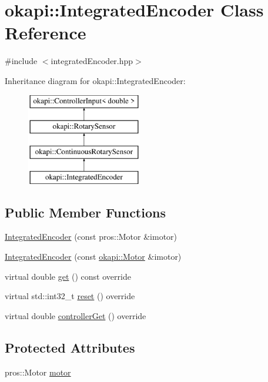 \hypertarget{classokapi_1_1IntegratedEncoder}{}\section{okapi\+::Integrated\+Encoder Class Reference}
\label{classokapi_1_1IntegratedEncoder}


{\ttfamily \#include $<$integrated\+Encoder.\+hpp$>$}

Inheritance diagram for okapi\+::Integrated\+Encoder\+:\begin{figure}[H]
\begin{center}
\leavevmode
\includegraphics[height=4.000000cm]{classokapi_1_1IntegratedEncoder}
\end{center}
\end{figure}
\subsection*{Public Member Functions}
\begin{DoxyCompactItemize}
\item 
\mbox{\hyperlink{classokapi_1_1IntegratedEncoder_a286d2b7796770ea5a91f498687cbe858}{Integrated\+Encoder}} (const pros\+::\+Motor \&imotor)
\item 
\mbox{\hyperlink{classokapi_1_1IntegratedEncoder_a05d0256b51e3631d9ee9177c4eafcb99}{Integrated\+Encoder}} (const \mbox{\hyperlink{classokapi_1_1Motor}{okapi\+::\+Motor}} \&imotor)
\item 
virtual double \mbox{\hyperlink{classokapi_1_1IntegratedEncoder_af3fe091ddf4b7f36443a5616bfedc3cb}{get}} () const override
\item 
virtual std\+::int32\+\_\+t \mbox{\hyperlink{classokapi_1_1IntegratedEncoder_a1f95f00f59911a87a9a38633343f4311}{reset}} () override
\item 
virtual double \mbox{\hyperlink{classokapi_1_1IntegratedEncoder_a5898ddc979b9cf2bcee0da3d440f28f8}{controller\+Get}} () override
\end{DoxyCompactItemize}
\subsection*{Protected Attributes}
\begin{DoxyCompactItemize}
\item 
pros\+::\+Motor \mbox{\hyperlink{classokapi_1_1IntegratedEncoder_a2610609752fafa3cf548b328e15e15db}{motor}}
\end{DoxyCompactItemize}


